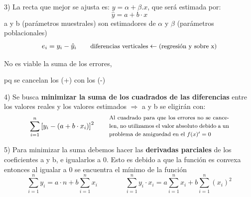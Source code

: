 \documentclass[10pt,a4paper]{article}
\begin{document}
\begin{minipage}[t]{0.55\textwidth}
\vspace{0pt}
3) La recta que mejor se ajusta es: $y = \alpha + \beta.x$, que será estimada por:
\[
\hat{y} = a + b\cdot x
\]
{\small a y b (parámetros muestrales) son estimadores de $\alpha$ y $\beta$ (parámetros poblacionales)}
\[
e_i = y_i - \hat{y}_i
\qquad
\text{\small diferencias verticales} \leftarrow \text{\small (regresión y sobre x)}
\]
\end{minipage}\hfill
\begin{minipage}[t]{0.42\textwidth}
\vspace{2pt}
\begin{center}
\end{center}
\vspace{-2pt}
\centerline{\footnotesize No es viable la suma de los errores,}
\centerline{\footnotesize pq se cancelan los (+) con los (-)}
\end{minipage}

4) Se busca \textbf{minimizar la suma de los cuadrados de las diferencias} entre los valores reales y los valores estimados $\Rightarrow$ a y b se eligirán con:
\[
\sum_{i=1}^{n} \left[ y_i - (a+b\cdot x_i) \right]^2
\qquad
\begin{minipage}{0.5\textwidth}
{\footnotesize Al cuadrado para que los errores no se cancelen, no utilizamos el valor absoluto debido a un problema de amiguedad en el $f(x)' = 0$}
\end{minipage}
\]

5) Para minimizar la suma debemos hacer las \textbf{derivadas parciales} de los coeficientes a y b, e igualarlos a 0. Esto es debido a que la función es convexa entonces al igualar a 0 se encuentra el mínimo de la función
\[
\sum_{i=1}^{n} y_i = a\cdot n + b\sum_{i=1}^{n} x_i
\qquad\qquad
\sum_{i=1}^{n} y_i\cdot x_i = a\sum_{i=1}^{n} x_i + b\sum_{i=1}^{n} (x_i)^2
\]
\end{document}

